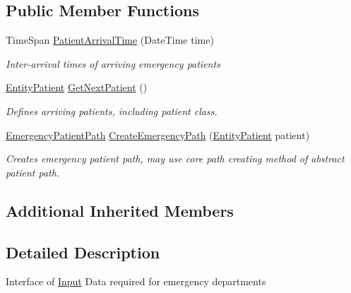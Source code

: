\subsection*{Public Member Functions}
\begin{DoxyCompactItemize}
\item 
Time\+Span \hyperlink{interface_general_health_care_elements_1_1_department_models_1_1_emergency_1_1_i_input_emergency_aa9ae07262ae5f7c3cf58ce645674daad}{Patient\+Arrival\+Time} (Date\+Time time)
\begin{DoxyCompactList}\small\item\em Inter-\/arrival times of arriving emergency patients \end{DoxyCompactList}\item 
\hyperlink{class_general_health_care_elements_1_1_entities_1_1_entity_patient}{Entity\+Patient} \hyperlink{interface_general_health_care_elements_1_1_department_models_1_1_emergency_1_1_i_input_emergency_aa0662b028a152d370c8c6b4734b104b0}{Get\+Next\+Patient} ()
\begin{DoxyCompactList}\small\item\em Defines arriving patients, including patient class. \end{DoxyCompactList}\item 
\hyperlink{class_general_health_care_elements_1_1_department_models_1_1_emergency_1_1_emergency_patient_path}{Emergency\+Patient\+Path} \hyperlink{interface_general_health_care_elements_1_1_department_models_1_1_emergency_1_1_i_input_emergency_a151c53ff30ab9d4e858d3bee9e199cd3}{Create\+Emergency\+Path} (\hyperlink{class_general_health_care_elements_1_1_entities_1_1_entity_patient}{Entity\+Patient} patient)
\begin{DoxyCompactList}\small\item\em Creates emergency patient path, may use core path creating method of abstract patient path. \end{DoxyCompactList}\end{DoxyCompactItemize}
\subsection*{Additional Inherited Members}


\subsection{Detailed Description}
Interface of \hyperlink{namespace_general_health_care_elements_1_1_input}{Input} Data required for emergency departments 



